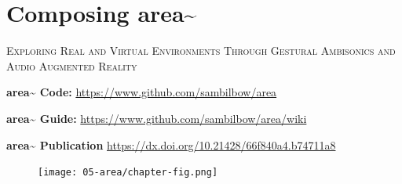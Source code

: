 \chapter{Composing area\textasciitilde{}}\label{sec: area}
\begin{flushright}
    \Large\textsc{Exploring Real and Virtual Environments Through Gestural Ambisonics and Audio Augmented Reality}
\end{flushright}
\begin{SingleSpace}
    \noindent \textbf{area\textasciitilde{} Code:}        \url{https://www.github.com/sambilbow/area}

    \noindent \textbf{area\textasciitilde{} Guide:}       \url{https://www.github.com/sambilbow/area/wiki}

    \noindent \textbf{area\textasciitilde{} Publication } \url{https://dx.doi.org/10.21428/66f840a4.b74711a8}
\end{SingleSpace}

\begin{figure}
    \centering
    \texttt{[image: 05-area/chapter-fig.png]}
    \captionsetup{labelformat=empty}
    \caption[\autoref*{sec: area}'s page-figure: \textit{area\textasciitilde{}} in use, (from \citeauthor{bilbow2021a}, \citeyear{bilbow2021a})]{}
\end{figure}

